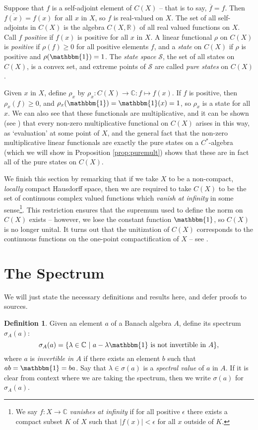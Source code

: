 \documentclass[12pt,a4paper]{report}
\theoremstyle{plain}
\theoremstyle{definition}
\newtheorem{defn}{Definition}
\newcommand{\1}{\mathbbm{1}}
\newcommand{\C}{\mathbb{C}}
\newcommand{\R}{\mathbb{R}}
\newcommand{\CX}{C(X)}
\renewcommand{\S}{\mathscr{S}}
\newcommand{\spec}[1]{\sigma(#1)}
\renewcommand{\bar}{\overline}
\begin{document}
Suppose that $f$ is a self-adjoint element of $\CX$ -- that is to say, $\bar f = f$. Then $\bar{f(x)} = 
f(x)$ for all $x$ in $X$, so $f$ is real-valued on $X$. The set of all self-adjoints in $\CX$ is the 
algebra $C(X,\R)$ of all real valued functions on $X$. Call $f$ \emph{positive} if $f(x)$ is positive 
for all $x$ in $X$. 
A linear functional $\rho$ on $\CX$ is \emph{positive} if $\rho(f)\geq 0$ for all positive elements $f$, 
and a \emph{state} on $\CX$ if $\rho$ is positive and $\rho(\1)=1$. The \emph{state space} $\S$, the set 
of all states on $\CX$, is a convex set, and extreme points of $\S$ are called \emph{pure states} on 
$\CX$.

Given $x$ in $X$, define $\rho_x$ by $\rho_x:\CX\to\C:f\mapsto f(x)$. If $f$ is positive, then 
$\rho_x(f) \geq 0$, and $\rho_x(\1) = \1(x)=1$, so $\rho_x$ is a state for all $x$. We can also see that 
these functionals are multiplicative, and it can be shown (see \cite[Corollary 3.4.2]{kadison83}) that 
every non-zero multiplicative functional on $\CX$ arises in this way, as `evaluation' at some point of 
$X$, and the general fact that the non-zero multiplicative linear functionals are exactly the pure 
states on a $C^\ast$-algebra (which we will show in Proposition \ref{prop:puremult}) shows that these 
are in fact all of the pure states on $\CX$.

We finish this section by remarking that if we take $X$ to be a non-compact, \emph{locally} compact 
Hausdorff space, then we are required to take $\CX$ to be the set of continuous complex valued functions 
which \emph{vanish at infinity} in some sense\footnote
{We say $f:X\to\C$ \emph{vanishes at infinity} if for all positive $\epsilon$ there exists a compact 
subset $K$ of $X$ such that $|f(x)|<\epsilon$ for all $x$ outside of $K$.}. This restriction ensures 
that the supremum used to define the norm on $\CX$ exists -- however, we lose the constant function 
$\1$, so $\CX$ is no longer unital. 
It turns out that the unitization of $\CX$ corresponds to the continuous functions on the one-point 
compactification of $X$ -- see \cite[II.1.2.2]{blackadar06}.



\section{The Spectrum}
We will just state the necessary definitions and results here, and defer proofs to sources.

\begin{defn}
	Given an element $a$ of a Banach algebra $A$, define its spectrum $\sigma_A(a)$:
	\[
		\sigma_A(a)=\{\lambda\in \C ~|~ a-\lambda\1 \mbox{ is not invertible in }A\},
	\]
	where $a$ is \emph{invertible in $A$} if there exists an element $b$ such that $ab=\1=ba$. 
	Say that $\lambda\in\spec a$ is a \emph{spectral value} of $a$ in $A$. If it is clear from context 
	where we are taking the spectrum, then we write $\spec{a}$ for $\sigma_A(a)$. 
\end{defn}
\end{document}
